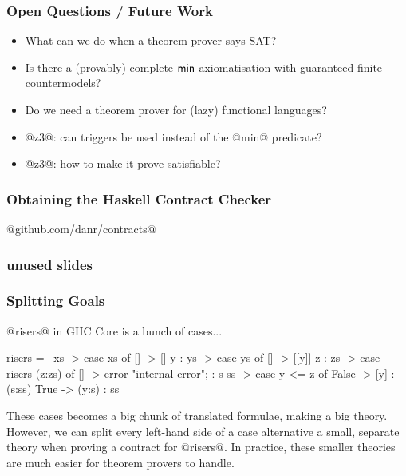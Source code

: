 \documentclass[serif,professionalfont]{beamer}
\begin{document}
\begin{frame}
  \frametitle{Open Questions / Future Work}

    \begin{itemize}

      \item What can we do when a theorem prover says SAT?

      \item Is there a (provably) complete $\mathsf{min}$-axiomatisation with
        guaranteed finite countermodels?

      \item Do we need a theorem prover for (lazy) functional languages?

      \item @z3@: can triggers be used instead of the @min@ predicate?

      \item @z3@: how to make it prove satisfiable?

    \end{itemize}

\end{frame}

\begin{frame}[fragile]
  \frametitle{Obtaining the Haskell Contract Checker}
    \begin{center}
      {\huge @github.com/danr/contracts@}
    \end{center}
\end{frame}

\begin{frame}[fragile]
  \frametitle{unused slides}

\end{frame}

\begin{frame}[fragile]
  \frametitle{Splitting Goals}
  @risers@ in GHC Core is a bunch of cases...

  \begin{code}
  risers = \ xs -> case xs of {
      [] -> []
      y : ys -> case ys of {
          [] -> [[y]]
          z : zs -> case risers (z:zs) of {
              [] -> error "internal error";
              : s ss -> case y <= z of {
                  False -> [y] : (s:ss)
                  True ->  (y:s) : ss
      } } } }
  \end{code}

  These cases becomes a big chunk of translated formulae, making a big
  theory. However, we can split every left-hand side of a case
  alternative a small, separate theory when proving a contract for
  @risers@. In practice, these smaller theories are much easier for
  theorem provers to handle.

\end{frame}
\end{document}
